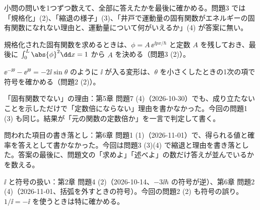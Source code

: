 \documentclass[uplatex,dvipdfmx,a4paper,11pt]{jsarticle}
\begin{document}
\matome
\begin{saitenichiran}
\end{saitenichiran}
\begin{daiji}
  \item 小問の問いを1つずつ数えて、全部に答えたかを最後に確かめる。問題3 では「規格化」(2)、「縮退の様子」(3)、「井戸で運動量の固有関数がエネルギーの固有関数になれない理由と、運動量について何がいえるか」(4) が答案に無い。
  \item 規格化された固有関数を求めるときは、$\phi=A\,\ee^{\ii px/\hbar}$ と定数 $A$ を残しておき、最後に $\int_{0}^{L}\abs{\phi}^{2}\dd x=1$ から $A$ を決める（問題3 (2)）。
  \item $\ee^{-\ii\theta}-\ee^{\ii\theta}=-2\ii\sin\theta$ のように $\ii$ が入る変形は、$\theta$ を小さくしたときの1次の項で符号を確かめる（問題2 (2)）。
\end{daiji}
\begin{maemo}
  \item 「固有関数でない」の理由：第5章 問題7 (4)（2026-10-30）でも、成り立たないことを示しただけで「定数倍にならない」理由を書かなかった。今回の問題1 (3) も同じ。結果が「元の関数の定数倍か」を一言で判定して書く。
  \item 問われた項目の書き落とし：第6章 問題1 (1)（2026-11-01）で、得られる値と確率を答えとして書かなかった。今回は問題3 (3)(4) で縮退と理由を書き落とした。答案の最後に、問題文の「求めよ」「述べよ」の数だけ答えが並んでいるかを数える。
  \item $\ii$ と符号の扱い：第2章 問題4 (2)（2026-10-14、$-3\ii\hbar$ の符号が逆）、第6章 問題2 (4)（2026-11-01、括弧を外すときの符号）。今回の問題2 (2) も符号の誤り。$1/\ii=-\ii$ を使うときは特に確かめる。
\end{maemo}
\end{document}
